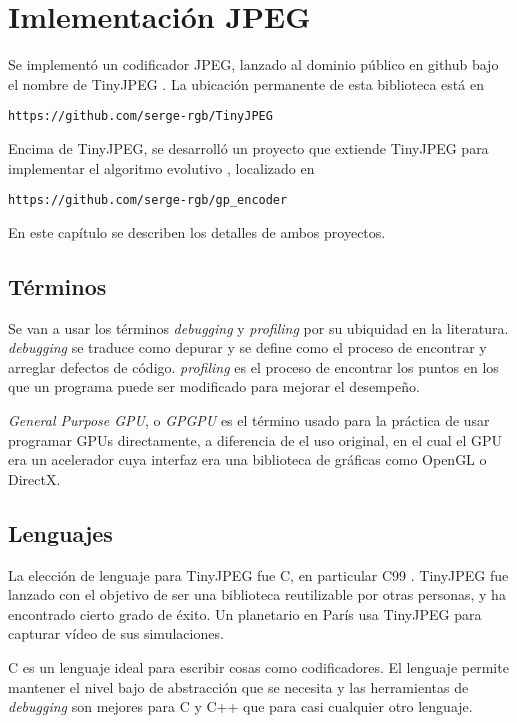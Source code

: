 \chapter{Imlementación JPEG}\label{ch:implementacion}

Se implementó un codificador JPEG, lanzado al dominio público en github bajo el
nombre de TinyJPEG \cite{tiny_jpeg}. La ubicación permanente de esta biblioteca
está en \begin{alltt}https://github.com/serge-rgb/TinyJPEG \end{alltt}

Encima de TinyJPEG, se desarrolló un proyecto que extiende TinyJPEG para
implementar el algoritmo evolutivo \cite{gp_encoder}, localizado en
\begin{alltt}https://github.com/serge-rgb/gp_encoder\end{alltt}

En este capítulo se describen los detalles de ambos proyectos.

\section {Términos}
Se van a usar los términos \emph{debugging} y \emph{profiling} por su ubiquidad
en la literatura. \emph{debugging} se traduce como depurar y se define como el
proceso de encontrar y arreglar defectos de código. \emph{profiling} es el
proceso de encontrar los puntos en los que un programa puede ser modificado
para mejorar el desempeño.

\emph{General Purpose GPU}, o \emph{GPGPU} es el
término usado para la práctica de usar programar GPUs directamente, a
diferencia de el uso original, en el cual el GPU era un acelerador cuya
interfaz era una biblioteca de gráficas como OpenGL o DirectX.

\section{Lenguajes}

La elección de lenguaje para TinyJPEG fue C, en particular C99 \cite{c99}.
TinyJPEG fue lanzado con el objetivo de ser una biblioteca reutilizable por
otras personas, y ha encontrado cierto grado de éxito. Un planetario en París
usa TinyJPEG para capturar vídeo de sus simulaciones.

C es un lenguaje ideal para escribir cosas como codificadores. El lenguaje
permite mantener el nivel bajo de abstracción que se necesita y las
herramientas de \emph{debugging} son mejores para C y C++ que para casi
cualquier otro lenguaje.

